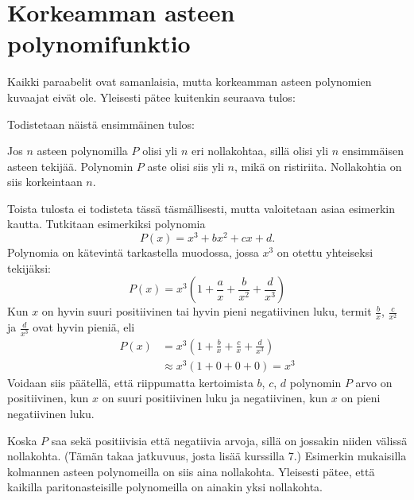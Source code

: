 \section{Korkeamman asteen polynomifunktio}


Kaikki paraabelit ovat samanlaisia, mutta korkeamman asteen polynomien kuvaajat eivät ole. Yleisesti pätee kuitenkin seuraava tulos:


Todistetaan näistä ensimmäinen tulos:

\begin{todistus}
Jos $n$ asteen polynomilla $P$ olisi yli $n$ eri nollakohtaa, sillä olisi yli $n$ ensimmäisen asteen tekijää. Polynomin $P$ aste olisi siis yli $n$, mikä on ristiriita. Nollakohtia on siis korkeintaan $n$.
\end{todistus}

Toista tulosta ei todisteta tässä täsmällisesti, mutta valoitetaan asiaa esimerkin kautta. Tutkitaan esimerkiksi polynomia 
$$P(x)=x^3+bx^2+cx+d.$$
Polynomia on kätevintä tarkastella muodossa, jossa $x^3$ on otettu yhteiseksi tekijäksi:
$$P(x) = x^3\left(1+\frac{a}{x}+\frac{b}{x^2}+\frac{d}{x^3}\right)$$
Kun $x$ on hyvin suuri positiivinen tai hyvin pieni negatiivinen luku,
termit $\frac{b}{x}$, $\frac{c}{x^2}$ ja $\frac{d}{x^3}$ ovat hyvin pieniä, eli
\begin{align*}
P(x)&= x^3\left(1+\frac{b}{x}+\frac{c}{x}+\frac{d}{x^3}\right) \\
	& \approx  x^3\left(1+0+0+0\right) = x^3
\end{align*}
Voidaan siis päätellä, että riippumatta kertoimista $b$, $c$, $d$ polynomin $P$ arvo on positiivinen, kun $x$ on suuri positiivinen luku ja negatiivinen, kun $x$ on pieni negatiivinen luku.

Koska $P$ saa sekä positiivisia että negatiivia arvoja, sillä on jossakin niiden välissä nollakohta. (Tämän takaa jatkuvuus, josta lisää kurssilla 7.) Esimerkin mukaisilla kolmannen asteen polynomeilla on siis aina nollakohta. Yleisesti pätee, että kaikilla paritonasteisille polynomeilla on ainakin yksi nollakohta.

